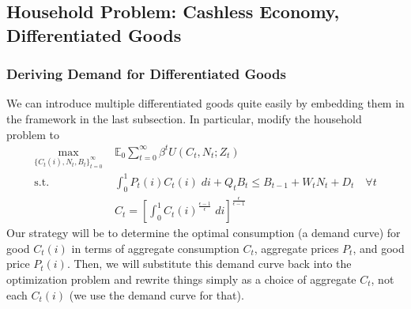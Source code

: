 \documentclass[12pt]{article}
\theoremstyle{plain}
\theoremstyle{definition}
\theoremstyle{remark}
\newcommand{\E}{\mathbb{E}}
\newcommand{\sumtinfz}{\sum^\infty_{t=0}}
\newcommand{\tinfz}{^\infty_{t=0}}
\begin{document}
\subsection{Household Problem: Cashless Economy, Differentiated Goods}
\label{sec:diffgood}

\subsubsection{Deriving Demand for Differentiated Goods}

We can introduce multiple differentiated goods quite easily by embedding
them in the framework in the last subsection. In particular, modify the
household problem to
\begin{align*}
  \max_{\{C_t(i),N_t,B_t\}\tinfz} \;
  &\E_0\sumtinfz \beta^t U(C_t,N_t;Z_t) \\
  \text{s.t.}\quad&
  \int_0^1 P_t(i)C_t(i)\; di + Q_{t}B_t \leq B_{t-1} + W_tN_t + D_t\quad \forall t\\
  & C_t =
    \left[ \int_0^1 C_t(i)^{\frac{\epsilon-1}{\epsilon}}\;di
    \right]^{\frac{\epsilon}{\epsilon-1}}
\end{align*}
Our strategy will be to determine the optimal consumption (a demand
curve) for good $C_t(i)$ in terms of aggregate consumption $C_t$,
aggregate prices $P_t$, and good price $P_t(i)$. Then, we will
substitute this demand curve back into the optimization problem and
rewrite things simply as a choice of aggregate $C_t$, not each $C_t(i)$
(we use the demand curve for that).
\end{document}
